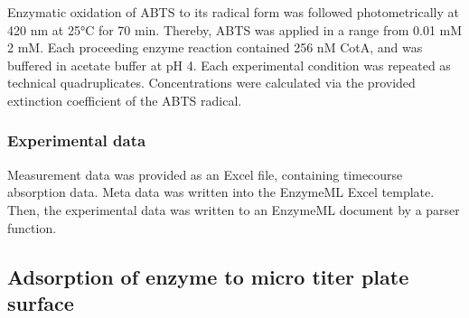 \documentclass[letterpaper,12pt,english]{jupyterBook}
\begin{document}
\sphinxAtStartPar
{}

Enzymatic oxidation of ABTS to its radical form was followed photometrically at 420 nm at 25°C for 70 min.
Thereby, ABTS was applied in a range from 0.01 mM \sphinxhyphen{} 2 mM. Each proceeding enzyme reaction contained 256 nM CotA, and was buffered in acetate buffer at pH 4. Each experimental condition was repeated as technical quadruplicates. Concentrations were calculated via the provided extinction coefficient of the ABTS radical.


\subsubsection{Experimental data}
\label{\detokenize{scenarios/enzyme_inactivation:experimental-data}}
\sphinxAtStartPar
Measurement data was provided as an Excel file, containing time\sphinxhyphen{}course absorption data. Meta data was written into the EnzymeML Excel template. Then, the experimental data was written to an EnzymeML document by a parser function.


\subsection{Adsorption of enzyme to micro titer plate surface}
\label{\detokenize{scenarios/enzyme_inactivation:adsorption-of-enzyme-to-micro-titer-plate-surface}}
\end{document}
